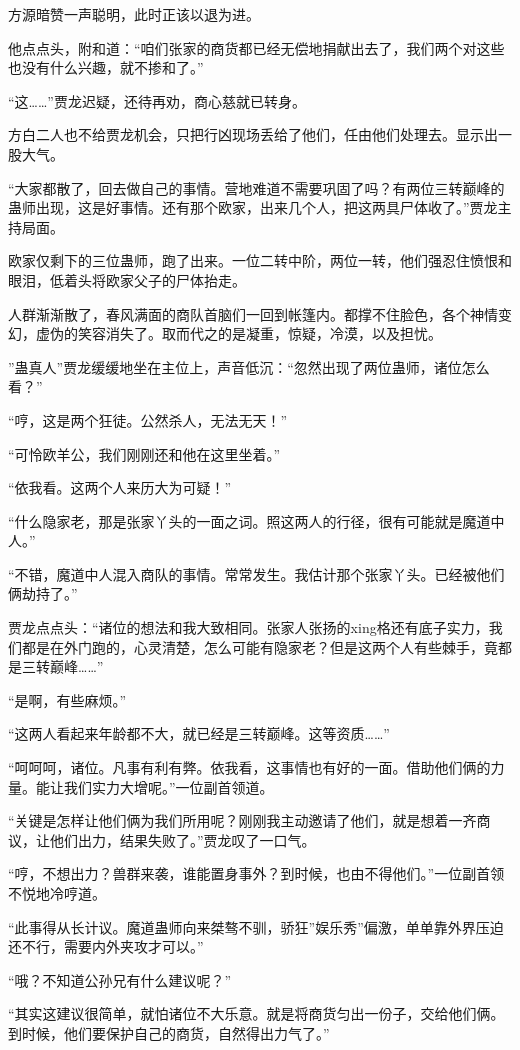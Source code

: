 \begin{this_body}
方源暗赞一声聪明，此时正该以退为进。

他点点头，附和道：“咱们张家的商货都已经无偿地捐献出去了，我们两个对这些也没有什么兴趣，就不掺和了。”

“这……”贾龙迟疑，还待再劝，商心慈就已转身。

方白二人也不给贾龙机会，只把行凶现场丢给了他们，任由他们处理去。显示出一股大气。

“大家都散了，回去做自己的事情。营地难道不需要巩固了吗？有两位三转巅峰的蛊师出现，这是好事情。还有那个欧家，出来几个人，把这两具尸体收了。”贾龙主持局面。

欧家仅剩下的三位蛊师，跑了出来。一位二转中阶，两位一转，他们强忍住愤恨和眼泪，低着头将欧家父子的尸体抬走。

人群渐渐散了，春风满面的商队首脑们一回到帐篷内。都撑不住脸色，各个神情变幻，虚伪的笑容消失了。取而代之的是凝重，惊疑，冷漠，以及担忧。

”蛊真人”贾龙缓缓地坐在主位上，声音低沉：“忽然出现了两位蛊师，诸位怎么看？”

“哼，这是两个狂徒。公然杀人，无法无天！”

“可怜欧羊公，我们刚刚还和他在这里坐着。”

“依我看。这两个人来历大为可疑！”

“什么隐家老，那是张家丫头的一面之词。照这两人的行径，很有可能就是魔道中人。”

“不错，魔道中人混入商队的事情。常常发生。我估计那个张家丫头。已经被他们俩劫持了。”

贾龙点点头：“诸位的想法和我大致相同。张家人张扬的xing格还有底子实力，我们都是在外门跑的，心灵清楚，怎么可能有隐家老？但是这两个人有些棘手，竟都是三转巅峰……”

“是啊，有些麻烦。”

“这两人看起来年龄都不大，就已经是三转巅峰。这等资质……”

“呵呵呵，诸位。凡事有利有弊。依我看，这事情也有好的一面。借助他们俩的力量。能让我们实力大增呢。”一位副首领道。

“关键是怎样让他们俩为我们所用呢？刚刚我主动邀请了他们，就是想着一齐商议，让他们出力，结果失败了。”贾龙叹了一口气。

“哼，不想出力？兽群来袭，谁能置身事外？到时候，也由不得他们。”一位副首领不悦地冷哼道。

“此事得从长计议。魔道蛊师向来桀骜不驯，骄狂”娱乐秀”偏激，单单靠外界压迫还不行，需要内外夹攻才可以。”

“哦？不知道公孙兄有什么建议呢？”

“其实这建议很简单，就怕诸位不大乐意。就是将商货匀出一份子，交给他们俩。到时候，他们要保护自己的商货，自然得出力气了。”


\end{this_body}
